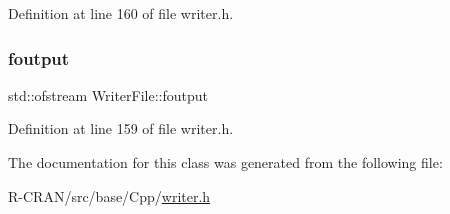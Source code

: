 Definition at line 160 of file writer.\+h.

\mbox{\label{classWriterFile_a846b117360d0cf149ec7bf02a375d025}} 
\subsubsection{\texorpdfstring{foutput}{foutput}}
{\footnotesize\ttfamily std\+::ofstream Writer\+File\+::foutput\hspace{0.3cm}{\ttfamily [private]}}



Definition at line 159 of file writer.\+h.



The documentation for this class was generated from the following file\+:\begin{DoxyCompactItemize}
\item 
R-\/\+C\+R\+A\+N/src/base/\+Cpp/\hyperlink{writer_8h}{writer.\+h}\end{DoxyCompactItemize}
